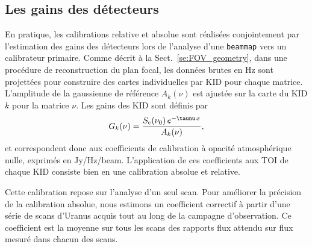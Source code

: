 \subsection{Les gains des détecteurs}
\label{se:gains}

En pratique, les calibrations relative et absolue sont réalisées
conjointement par l'estimation des gains des détecteurs lors de
l'analyse d'une {\tt beammap} vers un calibrateur primaire. Comme
décrit à la Sect.~\ref{se:FOV_geometry}, dans une procédure de
reconstruction du plan focal, les données brutes en Hz sont projettées
pour construire des cartes individuelles par KID pour chaque
matrice. L'amplitude de la gaussienne de
référence $A_k(\nu)$ est ajustée sur la carte du KID $k$ pour la
matrice $\nu$. Les gains des KID sont définis par
\begin{equation}
  G_k(\nu) = \frac{S_{\rm{c}}(\nu_0)\, e^{-\taunu\,x}}{A_k(\nu)},
  \label{eq:kid_gain}
\end{equation}
et correspondent donc aux coefficients de calibration à opacité
atmosphérique nulle, exprimés en Jy/Hz/beam. L'application de ces
coefficients aux TOI de chaque KID consiste bien en une calibration
absolue et relative.


Cette calibration repose sur l'analyse d'un seul scan. Pour améliorer
la précision de la calibration absolue, nous estimons un coefficient
correctif à partir d'une série de scans d'Uranus acquis tout au long
de la campagne d'observation. Ce coefficient est la moyenne sur tous
les scans des rapports flux attendu sur flux mesuré dans chacun des
scans.

